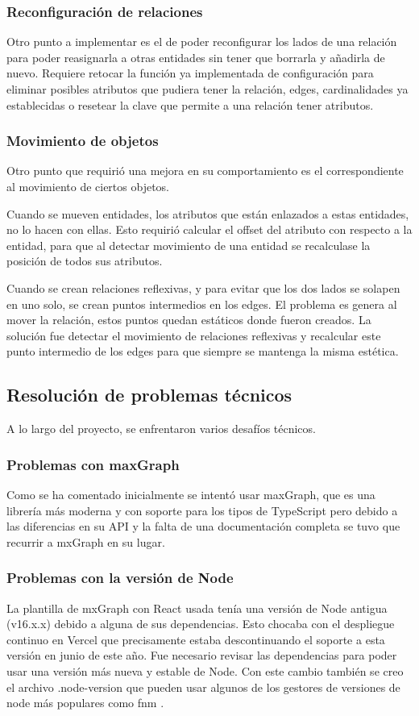 \subsubsection{Reconfiguración de relaciones}
Otro punto a implementar es el de poder reconfigurar los lados de una relación para poder reasignarla a otras entidades sin tener que borrarla y añadirla de nuevo.
Requiere retocar la función ya implementada de configuración para eliminar posibles atributos que pudiera tener la relación, edges, cardinalidades ya establecidas o resetear la clave que permite a una relación tener atributos.

\subsubsection{Movimiento de objetos}
Otro punto que requirió una mejora en su comportamiento es el correspondiente al movimiento de ciertos objetos.

Cuando se mueven entidades, los atributos que están enlazados a estas entidades, no lo hacen con ellas. Esto requirió calcular el offset del atributo con respecto a la entidad, para que al detectar movimiento de una entidad se recalculase la posición de todos sus atributos.

Cuando se crean relaciones reflexivas, y para evitar que los dos lados se solapen en uno solo, se crean puntos intermedios en los edges.
El problema es genera al mover la relación, estos puntos quedan estáticos donde fueron creados.
La solución fue detectar el movimiento de relaciones reflexivas y recalcular este punto intermedio de los edges para que siempre se mantenga la misma estética.

\subsection{Resolución de problemas técnicos}
A lo largo del proyecto, se enfrentaron varios desafíos técnicos.

\subsubsection{Problemas con maxGraph}
Como se ha comentado inicialmente se intentó usar maxGraph, que es una librería más moderna y con soporte para los tipos de TypeScript \cite{typescript} pero debido a las diferencias en su API y la falta de una documentación completa se tuvo que recurrir a mxGraph en su lugar.

\subsubsection{Problemas con la versión de Node}
La plantilla de mxGraph con React usada tenía una versión de Node antigua (v16.x.x) debido a alguna de sus dependencias. Esto chocaba con el despliegue continuo en Vercel que precisamente estaba descontinuando el soporte a esta versión en junio de este año.
Fue necesario revisar las dependencias para poder usar una versión más nueva y estable de Node. Con este cambio también se creo el archivo .node-version que pueden usar algunos de los gestores de versiones de node más populares como fnm \cite{fnm}.

